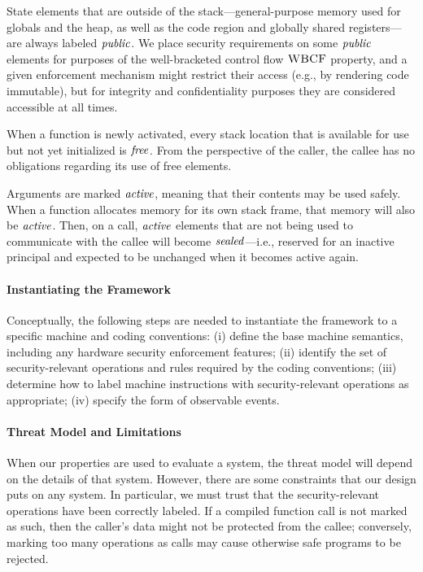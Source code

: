 \documentclass[10pt,conference]{ieeetran}%
\theoremstyle{definition}
\begin{document}
State elements that are outside of the stack---general-purpose memory used for
globals and the heap, as well as the code region and globally shared
registers---are always labeled \(\mathit{public}\). We place security requirements on some
\(\mathit{public}\) elements for purposes of the well-bracketed control flow \(\textnormal{\sc WBCF}\) property, and a
given enforcement mechanism
might restrict their access (e.g., by rendering code immutable), but for integrity
and confidentiality purposes they are considered accessible at all times.

When a function is newly activated, every stack location that is available
for use but not yet initialized
is \(\mathit{free}\). From the perspective of the caller, the callee has no obligations
regarding its use of free elements.

Arguments are marked \(\mathit{active}\), meaning that their contents may be
used safely.
When a function allocates memory for its own stack frame, that memory will also be \(\mathit{active}\).
Then, on a call, \(\mathit{active}\) elements that are not being used to communicate with
the callee will become \(\mathit{sealed}\)---i.e., reserved for an inactive principal
and expected to be unchanged when it becomes active again.

\paragraph*{Instantiating the Framework}

Conceptually, the following steps are needed to instantiate the framework to a specific machine
and coding conventions: (i) define the base machine semantics, including any hardware
security enforcement features; (ii) identify the set of
security-relevant operations and rules required by the coding conventions; (iii) determine
how to label machine instructions with security-relevant
operations as appropriate; (iv) specify the form of observable events.

\paragraph*{Threat Model and Limitations}

When our properties are used to evaluate a system, the threat model
will depend on the details of that system. However, there are some
constraints that our design puts on any system. In particular, we must
trust that the security-relevant operations have been correctly labeled.
If a compiled function
call is not marked as such, then the caller's data might not be
protected from the callee; conversely, marking too many operations as
calls may cause otherwise safe programs to be rejected.
\end{document}
